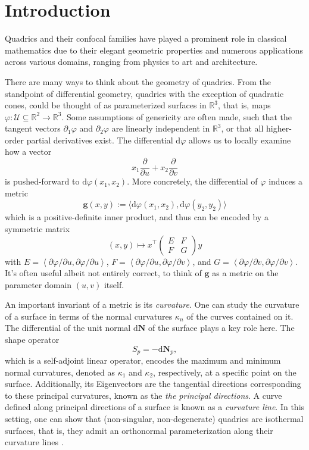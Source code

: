 \documentclass[10pt, a4paper]{article}
\theoremstyle{BoldTopSpacing}
\theoremstyle{BoldTopSpacing}
\theoremstyle{BoldTopSpacing}
\theoremstyle{BoldTopBottomSpacing}
\theoremstyle{BoldTopSpacing}
\theoremstyle{BoldTopBottomSpacing}
\theoremstyle{remark}
\begin{document}
\section{Introduction}
\label{sec:introduction}
Quadrics and their confocal families have played a prominent role in classical mathematics due to their elegant geometric properties and numerous applications across various domains, ranging from physics to art and architecture. \par
There are many ways to think about the geometry of quadrics. From the standpoint of differential geometry, quadrics \textemdash with the exception of quadratic cones, could be thought of as parameterized surfaces in $\mathbb{R}^3$, that is, maps $\varphi : \mathcal{U} \subseteq \mathbb{R}^2 \to \mathbb{R}^3$. Some assumptions of genericity are often made, such that the tangent vectors $\partial_{1} \varphi$ and $\partial_{2} \varphi$ are linearly independent in $\mathbb{R}^3$, or that all higher-order partial derivatives exist. The differential $\text{d}\varphi$ allows us to locally examine how a vector
\[
    x_{1} \frac{\partial}{\partial u} + x_{2} \frac{\partial}{\partial v}
\]
is pushed-forward to $\text{d}\varphi(x_{1}, x_{2})$. More concretely, the differential of $\varphi$ induces a metric
\[
    \boldsymbol{g}(x, y) := \langle \text{d}\varphi(x_{1}, x_{2}), \text{d}\varphi(y_{2}, y_{2}) \rangle
\]
which is a positive-definite inner product, and thus can be encoded by a symmetric matrix
\[
    (x, y) \mapsto x^\top \begin{pmatrix} E & F \\ F & G \end{pmatrix} y
\]
with $E = \left< \partial \varphi / \partial u, \partial \varphi / \partial u \right>$, $F = \left< \partial \varphi / \partial u, \partial \varphi / \partial v \right>$, and $G = \left< \partial \varphi / \partial v, \partial \varphi / \partial v \right>$. It's often useful \textemdash albeit not entirely correct, to think of $\boldsymbol{g}$ as a metric on the parameter domain $(u, v)$ itself. \par
An important invariant of a metric is its \textit{curvature}. One can study the curvature of a surface in terms of the normal curvatures $\kappa_{n}$ of the curves contained on it. The differential of the unit normal $\text{d}\boldsymbol{N}$ of the surface plays a key role here. The shape operator
\[
    S_{p} = - \text{d}\boldsymbol{N}_{p},
\]
which is a self-adjoint linear operator, encodes the maximum and minimum normal curvatures, denoted as $\kappa_{1}$ and $\kappa_{2}$, respectively, at a specific point on the surface. Additionally, its Eigenvectors are the tangential directions corresponding to these principal curvatures, known as the \textit{the principal directions}. A curve defined along principal directions of a surface is known as a \textit{curvature line}. In this setting, one can show that (non-singular, non-degenerate) quadrics are isothermal surfaces, that is, they admit an orthonormal parameterization along their curvature lines \cite{geometryIII}. \par
\end{document}
